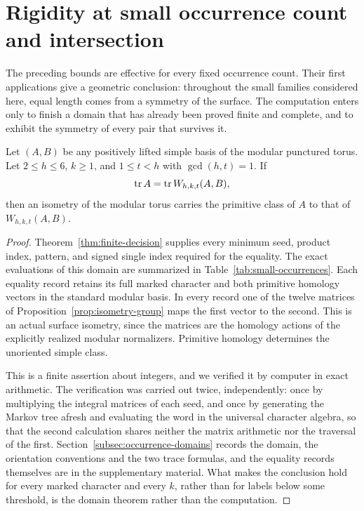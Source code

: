 \section{Rigidity at small occurrence count and intersection}
\label{sec:rigidity}

The preceding bounds are effective for every fixed occurrence count. Their first applications give a geometric conclusion: throughout the small families considered here, equal length comes from a symmetry of the surface. The computation enters only to finish a domain that has already been proved finite and complete, and to exhibit the symmetry of every pair that survives it.

\begin{theorem}
\label{thm:small-occurrences}
Let $(A,B)$ be any positively lifted simple basis of the modular punctured torus. Let $2\leqslant h\leqslant6$, $k\geqslant1$, and $1\leqslant t<h$ with $\gcd(h,t)=1$. If
$$
 \operatorname{tr} A=\operatorname{tr} W_{h,k,t}(A,B),
$$
then an isometry of the modular torus carries the primitive class of $A$ to that of $W_{h,k,t}(A,B)$.
\end{theorem}

\begin{proof}
Theorem~\ref{thm:finite-decision} supplies every minimum seed, product index, pattern, and signed single index required for the equality. The exact evaluations of this domain are summarized in Table~\ref{tab:small-occurrences}. Each equality record retains its full marked character and both primitive homology vectors in the standard modular basis. In every record one of the twelve matrices of Proposition~\ref{prop:isometry-group} maps the first vector to the second. This is an actual surface isometry, since the matrices are the homology actions of the explicitly realized modular normalizers. Primitive homology determines the unoriented simple class.

This is a finite assertion about integers, and we verified it by computer in exact arithmetic. The verification was carried out twice, independently: once by multiplying the integral matrices of each seed, and once by generating the Markov tree afresh and evaluating the word in the universal character algebra, so that the second calculation shares neither the matrix arithmetic nor the traversal of the first. Section~\ref{subsec:occurrence-domains} records the domain, the orientation conventions and the two trace formulas, and the equality records themselves are in the supplementary material. What makes the conclusion hold for every marked character and every $k$, rather than for labels below some threshold, is the domain theorem rather than the computation.
\end{proof}

